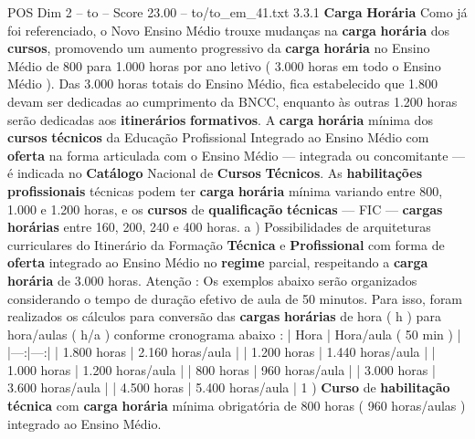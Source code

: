 \begin{textsample}{POS Dim 2 – to – Score 23.00 – to/to\_em\_41.txt}  \label{ex:f2_pos_135}
3.3.1 \textbf{Carga} \textbf{Horária} Como já foi referenciado, o Novo Ensino Médio trouxe mudanças na \textbf{carga} \textbf{horária} dos \textbf{cursos}, promovendo um aumento progressivo da \textbf{carga} \textbf{horária} no Ensino Médio de 800 para 1.000 horas por ano letivo ( 3.000 horas em todo o Ensino Médio ).
Das 3.000 horas totais do Ensino Médio, fica estabelecido que 1.800 devam ser dedicadas ao cumprimento da BNCC, enquanto às outras 1.200 horas serão dedicadas aos \textbf{itinerários} \textbf{formativos}.
A \textbf{carga} \textbf{horária} mínima dos \textbf{cursos} \textbf{técnicos} da Educação Profissional Integrado ao Ensino Médio com \textbf{oferta} na forma articulada com o Ensino Médio — integrada ou concomitante — é indicada no \textbf{Catálogo} Nacional de \textbf{Cursos} \textbf{Técnicos}.
As \textbf{habilitações} \textbf{profissionais} técnicas podem ter \textbf{carga} \textbf{horária} mínima variando entre 800, 1.000 e 1.200 horas, e os \textbf{cursos} de \textbf{qualificação} \textbf{técnicas} — FIC — \textbf{cargas} \textbf{horárias} entre 160, 200, 240 e 400 horas. a ) Possibilidades de arquiteturas curriculares do Itinerário da Formação \textbf{Técnica} e \textbf{Profissional} com forma de \textbf{oferta} integrado ao Ensino Médio no \textbf{regime} parcial, respeitando a \textbf{carga} \textbf{horária} de 3.000 horas.
Atenção : Os exemplos abaixo serão organizados considerando o tempo de duração efetivo de aula de 50 minutos.
Para isso, foram realizados os cálculos para conversão das \textbf{cargas} \textbf{horárias} de hora ( h ) para hora/aulas ( h/a ) conforme cronograma abaixo : | Hora | Hora/aula ( 50 min ) | |---:|---:| | 1.800 horas | 2.160 horas/aula | | 1.200 horas | 1.440 horas/aula | | 1.000 horas | 1.200 horas/aula | | 800 horas | 960 horas/aula | | 3.000 horas | 3.600 horas/aula | | 4.500 horas | 5.400 horas/aula | 1 ) \textbf{Curso} de \textbf{habilitação} \textbf{técnica} com \textbf{carga} \textbf{horária} mínima obrigatória de 800 horas ( 960 horas/aulas ) integrado ao Ensino Médio.

\end{textsample}
